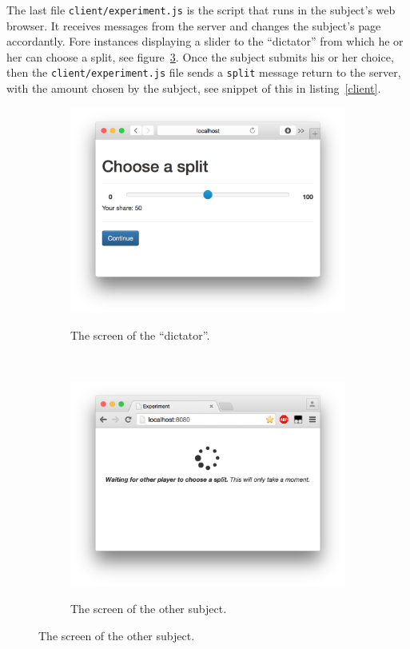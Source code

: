\documentclass[preprint, 12pt]{elsarticle}
\begin{document}
The last file \texttt{client/experiment.js} is the script that runs in the subject's web browser. It receives messages from the server and changes the subject's page accordantly. Fore instances displaying a slider to the ``dictator'' from which he or her can choose a split, see figure~\ref{f:screens}. Once the subject submits his or her choice, then the \texttt{client/experiment.js} file sends a \texttt{split} message return to the server, with the amount chosen by the subject, see snippet of this in listing~\ref{client}.

\begin{figure}[h!]
	\caption{The screens of respectively the ``dictator'' and the other subject}
	\centering
	\begin{subfigure}[b]{0.485\textwidth}
		\caption{The screen of the ``dictator''.}
		\includegraphics[width=\textwidth]{figures/screen_dictator.png}
		\label{f:screen_dictator}
	\end{subfigure}
	~
	\begin{subfigure}[b]{0.485\textwidth}
		\caption{The screen of the other subject.}
		\includegraphics[width=\textwidth]{figures/screen_other.png}
		\label{f:screen_other}
	\end{subfigure}
	\label{f:screens}
\end{figure}
\end{document}
